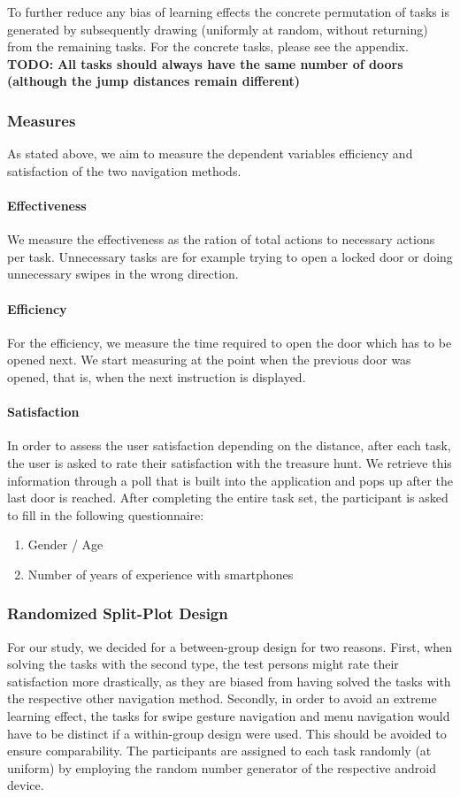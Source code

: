 \documentclass{sig-alternate-05-2015}
\newcommand{\todo}{\textbf{TODO:} \textbf}
\begin{document}
To further reduce any bias of learning effects
the concrete permutation of tasks is generated by subsequently drawing
(uniformly at random, without returning) from the remaining tasks.
For the concrete tasks, please see the appendix.
\todo{All tasks should always have the same number of doors (although the jump distances remain different)}
\subsubsection{Measures}
As stated above, we aim to measure the dependent variables efficiency and satisfaction of the two navigation methods.
\paragraph{Effectiveness}
We measure the effectiveness as the ration of total actions to necessary actions per task. Unnecessary tasks are for example trying to open a locked door or
doing unnecessary swipes in the wrong direction.
\paragraph{Efficiency} For the efficiency, we measure the time required to open the door which has to be opened next. We start measuring at the point
when the previous door was opened, that is, when the next instruction is displayed.
\paragraph{Satisfaction}
In order to assess the user satisfaction depending on the distance, after each task, the user is asked to rate their
satisfaction with the treasure hunt. We retrieve this information through a poll that is built into the application and pops
up after the last door is reached.
After completing the entire task set, the participant is asked to fill in the following questionnaire:
\begin{enumerate}
  \item Gender / Age
  \item Number of years of experience with smartphones
\end{enumerate}

\subsubsection{Randomized Split-Plot Design}
For our study, we decided for a between-group design for two reasons.  First,
when solving the tasks with the second type, the test persons might rate their
satisfaction more drastically, as they are biased from having solved the tasks
with the respective other navigation method.  Secondly, in order to avoid an
extreme learning effect, the tasks for swipe gesture navigation and menu
navigation would have to be distinct if a within-group design were used. This
should be avoided to ensure comparability.  The participants are assigned to
each task randomly (at uniform) by employing the random number generator of
the respective android device.
\end{document}
